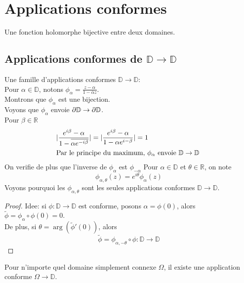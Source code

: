 \documentclass[../main.tex]{subfiles}
\begin{document}
\section{Applications conformes}
\begin{defn}
	Une fonction holomorphe bijective entre deux domaines.	
\end{defn}
\subsection{Applications conformes de $ \mathbb{D}\to \mathbb{D}$ }
Une famille d'applications conformes $ \mathbb{D}\to \mathbb{D}$:\\
Pour $\alpha\in \mathbb{D}$, notons $\phi_\alpha= \frac{z-\alpha}{ 1- \overline{\alpha}z}$.\\
Montrons que $\phi_\alpha  $ est une bijection.\\
Voyons que $\phi_\alpha	$ envoie $\partial \mathbb{D}\to \partial \mathbb{D}$.\\
Pour $\beta\in \mathbb{R}$
\begin{align*}
| \frac{ e^{i\beta} - \alpha}{1- \overline{\alpha e^{-i\beta}} }| &= | \frac{ e^{i\beta} -\alpha}{1- \alpha e^{i-\beta} }|=1	\\
\intertext{Par le principe du maximum, $\phi_\alpha$ envoie $ \mathbb{D}\to \mathbb{D}$ }
\end{align*}
On verifie de plus que l'inverse de $\phi_\alpha$ est $\phi_{-\alpha} $ 
Pour $\alpha\in \mathbb{D}$ et $\theta \in \mathbb{R}$, on note
\[ 
\phi_{\alpha,\theta} ( z) = e^{i\theta} \phi_\alpha( z) 
\]
Voyons pourquoi les $\phi_{\alpha,\theta} $ sont les seules applications conformes $ \mathbb{D}\to \mathbb{D}$.\\
\begin{proof}
Idee: si $\phi: \mathbb{D}\to \mathbb{D}$ est conforme, posons $\alpha= \phi( 0) $, alors $\tilde\phi= \phi_\alpha \circ \phi( 0) =0$.\\
De plus, si $\theta= \arg( \tilde\phi'( 0) ) $, alors 
\[ 
\tilde\phi= \phi_{\alpha,-\theta} \circ\phi: \mathbb{D}\to \mathbb{D}
\]

\end{proof}
\begin{thm}
Pour n'importe quel domaine simplement connexe $\Omega$, il existe une application conforme $ \Omega\to \mathbb{D}$.
\end{thm}
\end{document}
